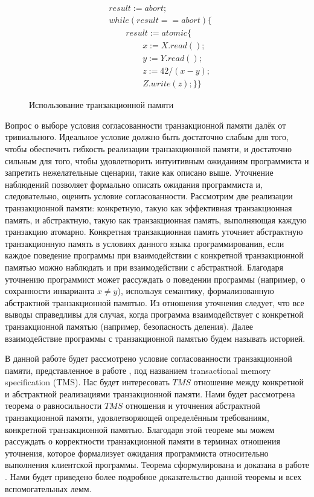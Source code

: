 \begin{figure}[t]
\begin{align*}
&result := abort;\\
&while \left (result == abort \right) \{ \\
& \qquad result := atomic \{ \\
& \qquad \qquad x := X.read(); \\
& \qquad \qquad y := Y.read(); \\ 
& \qquad \qquad z := 42 / (x - y); \\
& \qquad \qquad Z.write(z);\}\}
\end{align*}
\caption{Использование транзакционной памяти}
\label{fig:tm}
\end{figure}
Вопрос о выборе условия согласованности транзакционной памяти далёк от тривиального. Идеальное условие должно быть достаточно слабым для того, чтобы обеспечить гибкость реализации транзакционной памяти, и достаточно сильным для того, чтобы удовлетворить интуитивным ожиданиям программиста и запретить нежелательные сценарии, такие как описано выше. Уточнение наблюдений позволяет формально описать ожидания программиста и, следовательно, оценить условие согласованности. Рассмотрим две реализации транзакционной памяти: конкретную, такую как эффективная транзакционная память, и абстрактную, такую как транзакционная память, выполняющая каждую транзакцию атомарно. Конкретная транзакционная память уточняет абстрактную транзакционную память в условиях данного языка программирования, если каждое поведение программы при взаимодействии с конкретной транзакционной памятью можно наблюдать и при взаимодействии с абстрактной. Благодаря уточнению программист может рассуждать о поведении программы (например, о сохранности инварианта $x \neq y$), используя семантику, формализованную абстрактной транзакционной памятью. Из отношения уточнения следует, что все выводы справедливы для случая, когда программа взаимодействует с конкретной транзакционной памятью (например, безопасность деления). Далее взаимодействие программы с транзакционной памятью будем называть историей.    

В данной работе будет рассмотрено условие согласованности транзакционной памяти, представленное в работе \cite{tms_article}, под названием transactional memory specification (TMS). Нас будет интересовать $TMS$ отношение между конкретной и абстрактной реализациями транзакционной памяти. Нами будет рассмотрена теорема о равносильности $TMS$ отношения и уточнения абстрактной транзакционной памяти, удовлетворяющей определённым требованиям, конкретной транзакционной памятью. Благодаря этой теореме мы можем рассуждать о корректности транзакционной памяти в терминах отношения уточнения, которое формализует ожидания программиста относительно выполнения клиентской программы. Теорема сформулирована и доказана в работе \cite{tms_article}. Нами будет приведено более подробное доказательство данной теоремы и всех вспомогательных лемм. 

